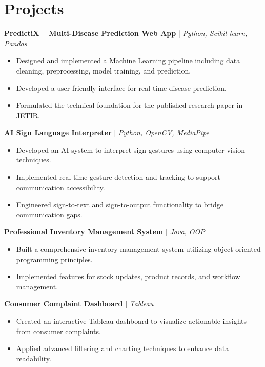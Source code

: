 \documentclass[10pt,letterpaper]{article}
\begin{document}
\section*{Projects}

\noindent \textbf{PredictiX – Multi-Disease Prediction Web App} | \textit{Python, Scikit-learn, Pandas}
\begin{itemize}[noitemsep, topsep=0pt, leftmargin=1.5em]
    \item Designed and implemented a Machine Learning pipeline including data cleaning, preprocessing, model training, and prediction.
    \item Developed a user-friendly interface for real-time disease prediction.
    \item Formulated the technical foundation for the published research paper in JETIR.
\end{itemize}

\vspace{2pt}

\noindent \textbf{AI Sign Language Interpreter} | \textit{Python, OpenCV, MediaPipe}
\begin{itemize}[noitemsep, topsep=0pt, leftmargin=1.5em]
    \item Developed an AI system to interpret sign gestures using computer vision techniques.
    \item Implemented real-time gesture detection and tracking to support communication accessibility.
    \item Engineered sign-to-text and sign-to-output functionality to bridge communication gaps.
\end{itemize}

\vspace{2pt}

\noindent \textbf{Professional Inventory Management System} | \textit{Java, OOP}
\begin{itemize}[noitemsep, topsep=0pt, leftmargin=1.5em]
    \item Built a comprehensive inventory management system utilizing object-oriented programming principles.
    \item Implemented features for stock updates, product records, and workflow management.
\end{itemize}

\vspace{2pt}

\noindent \textbf{Consumer Complaint Dashboard} | \textit{Tableau}
\begin{itemize}[noitemsep, topsep=0pt, leftmargin=1.5em]
    \item Created an interactive Tableau dashboard to visualize actionable insights from consumer complaints.
    \item Applied advanced filtering and charting techniques to enhance data readability.
\end{itemize}
\end{document}
